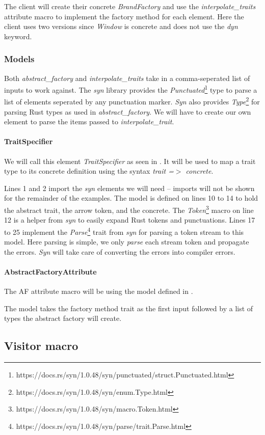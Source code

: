 The client will create their concrete \textit{BrandFactory} and use the \textit{interpolate\_traits} attribute macro to implement the factory method for each element.
Here the client uses two versions since \textit{Window} is concrete and does not use the \textit{dyn} keyword.

\subsubsection{Models}
Both \textit{abstract\_factory} and \textit{interpolate\_traits} take in a comma-seperated list of inputs to work against.
The \textit{syn} library provides the \textit{Punctuated}\footnote{https://docs.rs/syn/1.0.48/syn/punctuated/struct.Punctuated.html} type to parse a list of elements seperated by any punctuation marker.
\textit{Syn} also provides \textit{Type}\footnote{https://docs.rs/syn/1.0.48/syn/enum.Type.html} for parsing Rust types as used in \textit{abstract\_factory}.
We will have to create our own element to parse the items passed to \textit{interpolate\_trait}.

\paragraph{TraitSpecifier}
We will call this element \textit{TraitSpecifier} as seen in .
It will be used to map a trait type to its concrete definition using the syntax \textit{trait =$>$ concrete}.


Lines 1 and 2 import the \textit{syn} elements we will need -- imports will not be shown for the remainder of the examples.
The model is defined on lines 10 to 14 to hold the abstract trait, the arrow token, and the concrete.
The \textit{Token}\footnote{https://docs.rs/syn/1.0.48/syn/macro.Token.html} macro on line 12 is a helper from \textit{syn} to easily expand Rust tokens and punctuations.
Lines 17 to 25 implement the \textit{Parse}\footnote{https://docs.rs/syn/1.0.48/syn/parse/trait.Parse.html} trait from \textit{syn} for parsing a token stream to this model.
Here parsing is simple, we only \textit{parse} each stream token and propagate the errors.
\textit{Syn} will take care of converting the errors into compiler errors.

\paragraph{AbstractFactoryAttribute}
The AF attribute macro will be using the model defined in .


The model takes the factory method trait as the first input followed by a list of types the abstract factory will create.
\subsection{Visitor macro}
